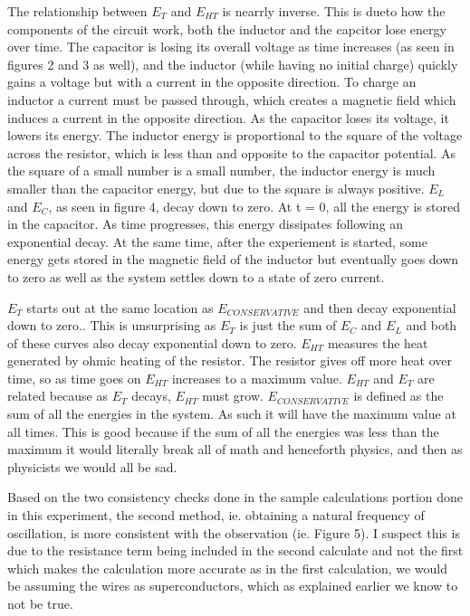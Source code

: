 \documentclass[twocolumn, letterpaper, 10pt, twoside]{article}
\begin{document}
The relationship between $E_T$ and $E_{HT}$ is nearrly inverse. This is dueto how the components of the circuit work, both the inductor and the capcitor lose energy over time. The capacitor is losing its overall voltage as time increases (as seen in figures 2 and 3 as well), and the inductor (while having no initial charge) quickly gains a voltage but with a current in the opposite direction. To charge an inductor a current must be passed through, which creates a magnetic field which induces a current in the opposite direction. As the capacitor loses its voltage, it lowers its energy. The inductor energy is proportional to the square of the voltage across the resistor, which is less than and opposite to the capacitor potential. As the square of a small number is a small number, the inductor energy is much smaller than the capacitor energy, but due to the square is always positive. $E_L$ and $E_C$, as seen in figure 4, decay down to zero. At t = 0, all the energy is stored in the capacitor. As time progresses, this energy dissipates following an exponential decay. At the same time, after the experiement is started, some energy gets stored in the magnetic field of the inductor but eventually goes down to zero as well as the system settles down to a state of zero current. 

$E_T$ starts out at the same location as $E_{CONSERVATIVE}$ and then decay exponential down to zero.. This is unsurprising as $E_T$ is just the sum of $E_C$ and $E_L$ and both of these curves also decay exponential down to zero. $E_{HT}$ measures the heat generated by ohmic heating of the resistor. The resistor gives off more heat over time, so as time goes on $E_{HT}$ increases to a maximum value. $E_{HT}$ and $E_{T}$ are related because as $E_{T}$ decays, $E_{HT}$ must grow. $E_{CONSERVATIVE}$ is defined as the sum of all the energies in the system. As such it will have the maximum value at all times. This is good because if the sum of all the energies was less than the maximum it would literally break all of math and henceforth physics, and then as physicists we would all be sad. 

Based on the two consistency checks done in the sample calculations portion done in this experiment, the second method, ie. obtaining a natural frequency of oscillation, is more consistent with the observation (ie. Figure 5). I suspect this is due to the resistance term being included in the second calculate and not the first which makes the calculation more accurate as in the first calculation, we would be assuming the wires as superconductors, which as explained earlier we know to not be true. 
\end{document}
